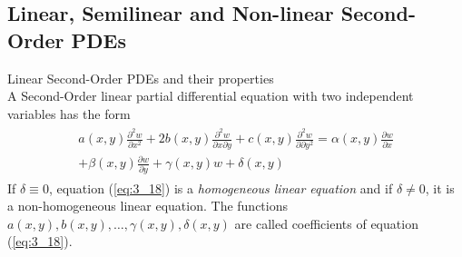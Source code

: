 \documentclass[11pt]{report}
\newcommand{\sps}{\\[0.2cm]}
\newcommand{\refn}[1]{(\ref{#1})}
\newcommand{\refx}[1]{\refn{eq:#1}}
\begin{document}
	\subsection{Linear, Semilinear and Non-linear Second-Order PDEs}
	Linear Second-Order PDEs and their properties\sps
	A Second-Order linear partial differential equation with two independent variables has the form 
	\begin{eqnarray}
		\begin{split}
			a(x,y)\frac{\partial^2 w}{\partial x^2} + 2b(x,y)\frac{\partial^2 w}{\partial x \partial y} + c(x,y)\frac{\partial^2 w}{\partial \partial y^2} = \alpha(x,y)\frac{\partial w}{\partial x}\\ +\beta(x,y)\frac{\partial w}{\partial y}
			+ \gamma(x,y)w + \delta(x,y) 
		\end{split}\label{eq:3_18}
	\end{eqnarray}
	If $\delta\equiv 0$, equation \refx{3_18} is a \textit{homogeneous linear equation} and if $\delta \neq 0$, it is a non-homogeneous linear equation. The functions $a(x,y), b(x,y),\ldots,\gamma(x,y),\delta(x,y)$ are called coefficients of equation \refx{3_18}.\\
	
\end{document}
